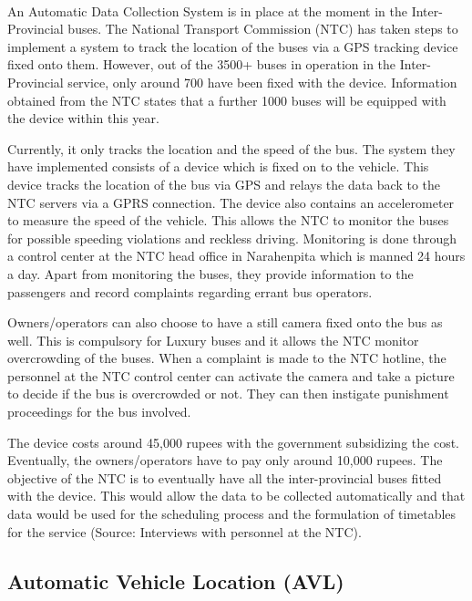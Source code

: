\documentclass[12pt, oneside]{report}
\begin{document}
\paragraph{ } An Automatic Data Collection System is in place at the moment in the Inter-Provincial buses. The National Transport Commission (NTC) has taken steps to implement a system to track the location of the buses via a GPS tracking device fixed onto them. However, out of the 3500+ buses in operation in the Inter-Provincial service, only around 700 have been fixed with the device. Information obtained from the NTC states that a further 1000 buses will be equipped with the device within this year.

Currently, it only tracks the location and the speed of the bus. The system they have implemented consists of a device which is fixed on to the vehicle. This device tracks the location of the bus via GPS and relays the data back to the NTC servers via a GPRS connection. The device also contains an accelerometer to measure the speed of the vehicle. This allows the NTC to monitor the buses for possible speeding violations and reckless driving. Monitoring is done through a control center at the NTC head office in Narahenpita which is manned 24 hours a day. Apart from monitoring the buses, they provide information to the passengers and record complaints regarding errant bus operators.

Owners/operators can also choose to have a still camera fixed onto the bus as well. This is compulsory for Luxury buses and it allows the NTC monitor overcrowding of the buses. When a complaint is made to the NTC hotline, the personnel at the NTC control center can activate the camera and take a picture to decide if the bus is overcrowded or not. They can then instigate punishment proceedings for the bus involved.

The device costs around 45,000 rupees with the government subsidizing the cost. Eventually, the owners/operators have to pay only around 10,000 rupees. The objective of the NTC is to eventually have all the inter-provincial buses fitted with the device. This would allow the data to be collected automatically and that data would be used for the scheduling process and the formulation of timetables for the service (Source: Interviews with personnel at the NTC).

\subsection{Automatic Vehicle Location (AVL)}
\end{document}
